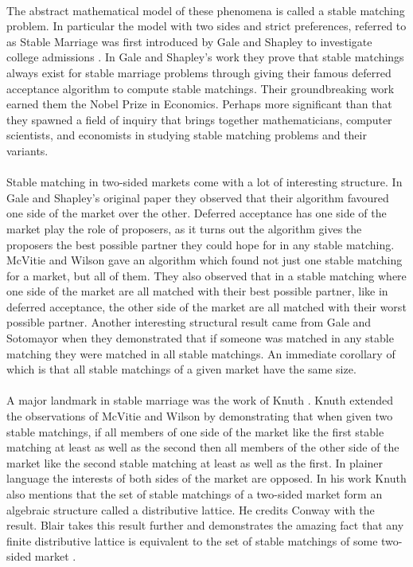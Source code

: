 \paragraph{}
The abstract mathematical model of these phenomena is called a stable matching problem. In particular the model with two sides and strict preferences, referred to as Stable Marriage was first introduced by Gale and Shapley to investigate college admissions \cite{gale1962college}. In Gale and Shapley's work they prove that stable matchings always exist for stable marriage problems through giving their famous deferred acceptance algorithm to compute stable matchings. Their groundbreaking work earned them the Nobel Prize in Economics. Perhaps more significant than that they spawned a field of inquiry that brings together mathematicians, computer scientists, and economists in studying stable matching problems and their variants.
\paragraph{}
Stable matching in two-sided markets come with a lot of interesting structure. In Gale and Shapley's original paper they observed that their algorithm favoured one side of the market over the other. Deferred acceptance has one side of the market play the role of proposers, as it turns out the algorithm gives the proposers the best possible partner they could hope for in any stable matching. McVitie and Wilson \cite{mcvitie1971stable} gave an algorithm which found not just one stable matching for a market, but all of them. They also observed that in a stable matching where one side of the market are all matched with their best possible partner, like in deferred acceptance, the other side of the market are all matched with their worst possible partner. Another interesting structural result came from Gale and Sotomayor \cite{gale1985some} when they demonstrated that if someone was matched in any stable matching they were matched in all stable matchings. An immediate corollary of which is that all stable matchings of a given market have the same size. 
\paragraph{}
A major landmark in stable marriage was the work of Knuth \cite{knuthmariages}. Knuth extended the observations of McVitie and Wilson by demonstrating that when given two stable matchings, if all members of one side of the market like the first stable matching at least as well as the second then all members of the other side of the market like the second stable matching at least as well as the first. In plainer language the interests of both sides of the market are opposed. In his work Knuth also mentions that the set of stable matchings of a two-sided market form an algebraic structure called a distributive lattice. He credits Conway with the result. Blair takes this result further and demonstrates the amazing fact that any finite distributive lattice is equivalent to the set of stable matchings of some two-sided market \cite{blair1984every}.
